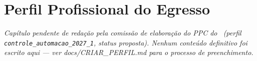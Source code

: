 \chapter{Perfil Profissional do Egresso}

\textit{Capítulo pendente de redação pela comissão de elaboração do PPC do
\ppccurso\ (perfil \texttt{controle\_automacao\_2027\_1}, status
proposta). Nenhum conteúdo definitivo foi escrito aqui — ver
docs/CRIAR\_PERFIL.md para o processo de preenchimento.}
